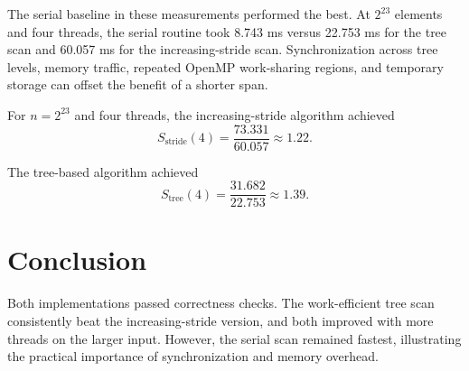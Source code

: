 \documentclass[11pt,letterpaper,twocolumn]{article}
\begin{document}
The serial baseline in these measurements performed the best. At $2^{23}$ elements and four threads, the serial routine took 8.743 ms versus 22.753 ms for the tree scan and 60.057 ms for the increasing-stride scan. Synchronization across tree levels, memory traffic, repeated OpenMP work-sharing regions, and temporary storage can offset the benefit of a shorter span.

For $n=2^{23}$ and four threads, the
increasing-stride algorithm achieved
\[
S_{\mathrm{stride}}(4)
=\frac{73.331}{60.057}
\approx 1.22.
\]

The tree-based algorithm achieved
\[
S_{\mathrm{tree}}(4)
=\frac{31.682}{22.753}
\approx 1.39.
\]

\section*{Conclusion}
Both implementations passed correctness checks. The work-efficient tree scan consistently beat the increasing-stride version, and both improved with more threads on the larger input. However, the serial scan remained fastest, illustrating the practical importance of synchronization and memory overhead.
\end{document}
